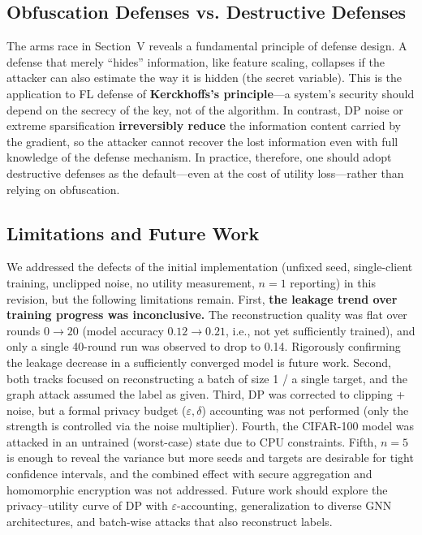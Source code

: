 \documentclass[conference]{IEEEtran}
\begin{document}
\subsection{Obfuscation Defenses vs. Destructive Defenses}
The arms race in Section~V reveals a fundamental principle of defense design. A
defense that merely ``hides'' information, like feature scaling, collapses if the
attacker can also estimate the way it is hidden (the secret variable). This is
the application to FL defense of \textbf{Kerckhoffs's principle}---a system's
security should depend on the secrecy of the key, not of the algorithm. In
contrast, DP noise or extreme sparsification \textbf{irreversibly reduce} the
information content carried by the gradient, so the attacker cannot recover the
lost information even with full knowledge of the defense mechanism. In practice,
therefore, one should adopt destructive defenses as the default---even at the cost
of utility loss---rather than relying on obfuscation.

\subsection{Limitations and Future Work}
We addressed the defects of the initial implementation (unfixed seed,
single-client training, unclipped noise, no utility measurement, $n{=}1$
reporting) in this revision, but the following limitations remain. First,
\textbf{the leakage trend over training progress was inconclusive.} The
reconstruction quality was flat over rounds $0\to20$ (model accuracy $0.12\to0.21$,
i.e., not yet sufficiently trained), and only a single 40-round run was observed
to drop to 0.14. Rigorously confirming the leakage decrease in a sufficiently
converged model is future work. Second, both tracks focused on reconstructing a
batch of size 1 / a single target, and the graph attack assumed the label as
given. Third, DP was corrected to clipping + noise, but a formal privacy
budget ($\varepsilon, \delta$) accounting was not performed (only the strength is
controlled via the noise multiplier). Fourth, the CIFAR-100 model was attacked in
an untrained (worst-case) state due to CPU constraints. Fifth, $n{=}5$ is enough
to reveal the variance but more seeds and targets are desirable for tight
confidence intervals, and the combined effect with secure aggregation and
homomorphic encryption was not addressed. Future work should explore the
privacy--utility curve of DP with $\varepsilon$-accounting, generalization to
diverse GNN architectures, and batch-wise attacks that also reconstruct labels.
\end{document}
